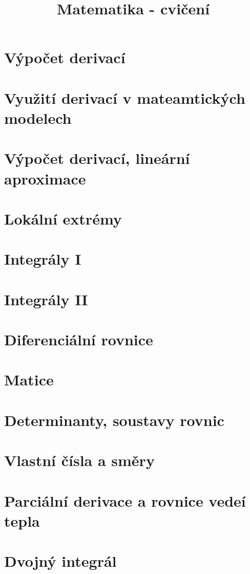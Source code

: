 \documentclass[]{report}
\title{Matematika - cvičení}
\author{}
\date{}
\begin{document}
\maketitle

\let\figure\comment
\let\endfigure\endcomment

\setcounter{tocdepth}{0}
\tableofcontents

\chapter{Výpočet derivací}

\chapter{Využití derivací v mateamtických modelech}

\chapter{Výpočet derivací, lineární aproximace}

\chapter{Lokální extrémy}

\chapter{Integrály I}

\chapter{Integrály II}

\chapter{Diferenciální rovnice}

\chapter{Matice}

\chapter{Determinanty, soustavy rovnic}

\chapter{Vlastní čísla a směry}

\chapter{Parciální derivace a rovnice vedeí tepla}

\chapter{Dvojný integrál}

\end{document}
